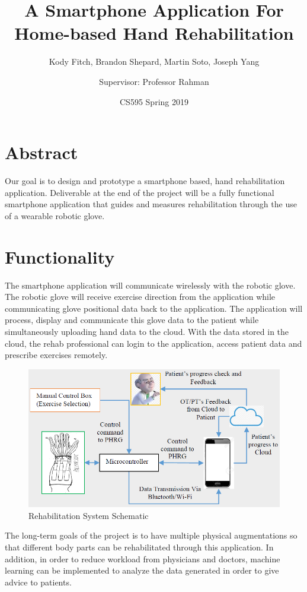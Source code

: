 \documentclass[a4paper,10pt]{article}
\title{\vspace{-10ex}A Smartphone Application For Home-based Hand Rehabilitation}
\author{Kody Fitch, Brandon Shepard, Martin Soto, Joseph Yang\and Supervisor: Professor Rahman}
\date{CS595 Spring 2019}
\begin{document}
\maketitle

\section{Abstract}
    Our goal is to design and prototype a smartphone based, hand rehabilitation application. Deliverable at the end of the project will be a fully functional smartphone application that guides and measures rehabilitation through the use of a wearable robotic glove. 

\section{Functionality}
    The smartphone application will communicate wirelessly with the robotic glove. The robotic glove will receive exercise direction from the application while communicating glove positional data back to the application. The application will process, display and communicate this glove data to the patient while simultaneously uploading hand data to the cloud. With the data stored in the cloud, the rehab professional can login to the application, access patient data and prescribe exercises remotely.
    \begin{figure}[h]
         \centering
         \includegraphics[width=1\textwidth]{rahmanSchematic}
         \caption{Rehabilitation System Schematic}
    \end{figure}
The long-term goals of the project is to have multiple physical augmentations so that different body parts can be rehabilitated through this application. In addition, in order to reduce workload from physicians and doctors, machine learning can be implemented to analyze the data generated in order to give advice to patients.
\end{document}
